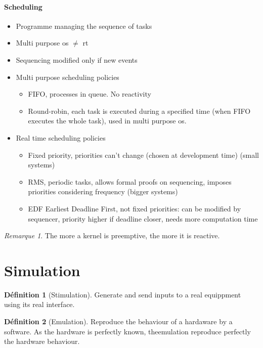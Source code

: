 \documentclass[10pt]{article}
\theoremstyle{plain}
\theoremstyle{definition}
\newtheorem{defn}{Définition}
\theoremstyle{remark}
\newtheorem{rem}{Remarque}
\begin{document}
\paragraph{Scheduling}
\begin{itemize}
	\item Programme managing the sequence of tasks
	\item Multi purpose os $\ne$ rt
	\item Sequencing modified only if new events
	\item Multi purpose scheduling policies
		\begin{itemize}
			\item FIFO, processes in queue. No reactivity
			\item Round-robin, each task is executed during a specified time
				(when FIFO executes the whole task), used in multi purpose os.
		\end{itemize}
	\item Real time scheduling policies
		\begin{itemize}
			\item Fixed priority, priorities can't change (chosen at development
				time) (small systems)
			\item RMS, periodic tasks, allows formal proofs on
				sequencing, imposes priorities considering frequency (bigger
				systems)
			\item EDF Earliest Deadline First, not fixed priorities: can be
				modified by sequencer, priority higher if deadline closer, needs
				more computation time
		\end{itemize}
\end{itemize}
\begin{rem}
	The more a kernel is preemptive, the more it is reactive.
\end{rem}

\section{Simulation}
\begin{defn}
	[Stimulation]
	Generate and send inputs to a real equippment using its real interface.
\end{defn}

\begin{defn}
	[Emulation]
	Reproduce the behaviour of a hardaware by a software. As the hardware is
	perfectly known, theemulation reproduce perfectly the hardware behaviour.
\end{defn}
\end{document}
